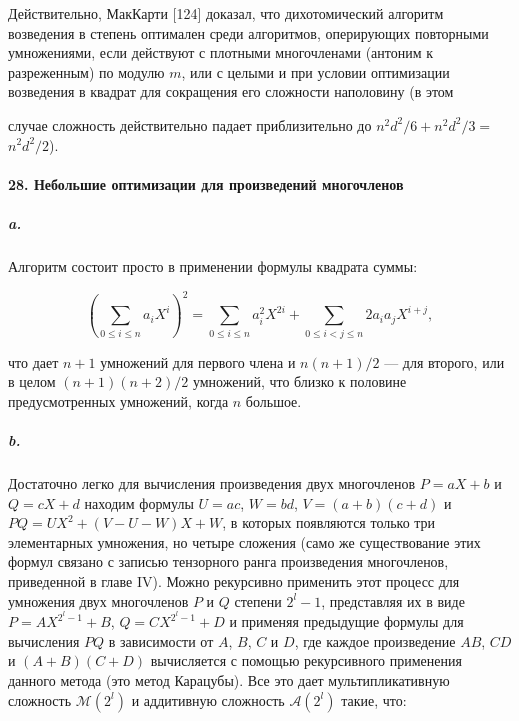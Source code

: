 \documentclass{../../template/mai_book}
\begin{document}
Действительно, МакКарти [124] доказал, что дихотомический алгоритм возведения в степень оптимален среди алгоритмов, оперирующих повторными умножениями, если действуют с плотными многочленами (антоним к разреженным) по модулю $m$, или с целыми и при условии оптимизации возведения в квадрат для сокращения его сложности наполовину (в этом

\newpage


\noindent
случае сложность действительно падает приблизительно до $n^2 d^2 / 6 + n^2 d^2 / 3 =$ \linebreak $n^2 d^2 / 2$).

\paragraph{28. Небольшие оптимизации для произведений многочленов}

\subparagraph{a.} Алгоритм состоит просто в применении формулы квадрата
суммы:

\begin{equation*}
\left( \sum_{0 \leqslant i \leqslant n} a_i X^i \right)^2 = \sum_{0 \leqslant i \leqslant n} a_i^2 X^{2i} + \sum_{0 \leqslant i < j \leqslant n} 2a_i a_j X^{i + j},
\end{equation*}

\noindent
что дает $n + 1$ умножений для первого члена и $n(n + 1)/2$ — для  второго, или в целом $(n + 1)(n + 2)/2$ умножений, что близко к половине предусмотренных умножений, когда $n$ большое.

\subparagraph{b.} Достаточно легко для вычисления произведения двух многочленов $P = aX + b$ и $Q = cX + d$ находим формулы $U = ac$, $W = bd$, $V = (a + b)(c + d)$ и $PQ = UX^2 + (V - U - W)X + W$, в которых появляются только три элементарных умножения, но четыре сложения (само же существование этих формул связано с записью тензорного ранга произведения многочленов, приведенной в главе IV). Можно рекурсивно применить этот процесс для умножения двух многочленов $P$ и $Q$ степени $2^l - 1$, представляя их в виде $P = AX^{2^l - 1} + B$, $Q = CX^{2^l - 1} + D$ и применяя предыдущие формулы для вычисления $PQ$ в зависимости от $A$, $B$, $C$ и $D$, где каждое произведение $AB$, $CD$ и $(A + B)(C + D)$ вычисляется с помощью рекурсивного применения данного метода (это метод Карацубы). Все это дает мультипликативную сложность $\mathcal{M}(2^l)$ и аддитивную сложность $\mathcal{A}(2^l)$ такие, что:
\end{document}
